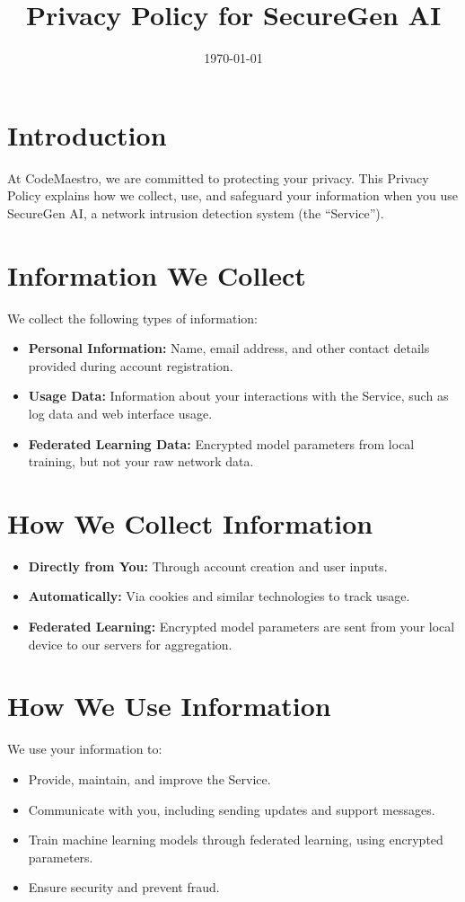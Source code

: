 \documentclass[12pt]{article}
\begin{document}
\title{Privacy Policy for SecureGen AI}
\author{}
\date{\today}
\maketitle

\section*{Introduction}
At CodeMaestro, we are committed to protecting your privacy. This Privacy Policy explains how we collect, use, and safeguard your information when you use SecureGen AI, a network intrusion detection system (the ``Service'').

\section*{Information We Collect}
We collect the following types of information:
\begin{itemize}
    \item \textbf{Personal Information:} Name, email address, and other contact details provided during account registration.
    \item \textbf{Usage Data:} Information about your interactions with the Service, such as log data and web interface usage.
    \item \textbf{Federated Learning Data:} Encrypted model parameters from local training, but not your raw network data.
\end{itemize}

\section*{How We Collect Information}
\begin{itemize}
    \item \textbf{Directly from You:} Through account creation and user inputs.
    \item \textbf{Automatically:} Via cookies and similar technologies to track usage.
    \item \textbf{Federated Learning:} Encrypted model parameters are sent from your local device to our servers for aggregation.
\end{itemize}

\section*{How We Use Information}
We use your information to:
\begin{itemize}
    \item Provide, maintain, and improve the Service.
    \item Communicate with you, including sending updates and support messages.
    \item Train machine learning models through federated learning, using encrypted parameters.
    \item Ensure security and prevent fraud.
\end{itemize}
\end{document}
